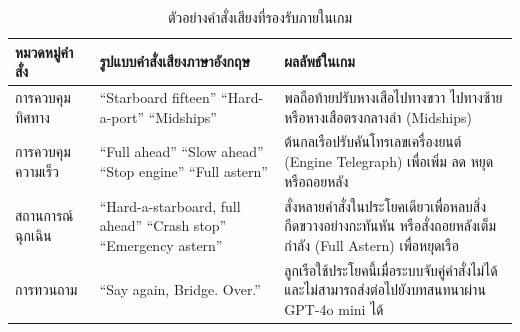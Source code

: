 \begin{table}[H]
\centering
\caption{ตัวอย่างคำสั่งเสียงที่รองรับภายในเกม}
\label{tab:voice_commands}
\small
\begin{tabular}{|L{2.85cm}|L{5.22cm}|L{5.22cm}|}
\hline
\textbf{หมวดหมู่คำสั่ง} & \textbf{รูปแบบคำสั่งเสียงภาษาอังกฤษ} & \textbf{ผลลัพธ์ในเกม} \\ \hline
การควบคุมทิศทาง & ``Starboard fifteen'' ``Hard-a-port'' ``Midships'' & พลถือท้ายปรับหางเสือไปทางขวา ไปทางซ้าย หรือหางเสือตรงกลางลำ (Midships) \\ \hline
การควบคุมความเร็ว & ``Full ahead'' ``Slow ahead'' ``Stop engine'' ``Full astern'' & ต้นกลเรือปรับคันโทรเลขเครื่องยนต์ (Engine Telegraph) เพื่อเพิ่ม ลด หยุด หรือถอยหลัง \\ \hline
สถานการณ์ฉุกเฉิน & ``Hard-a-starboard, full ahead'' ``Crash stop'' ``Emergency astern'' & สั่งหลายคำสั่งในประโยคเดียวเพื่อหลบสิ่งกีดขวางอย่างกะทันหัน หรือสั่งถอยหลังเต็มกำลัง (Full Astern) เพื่อหยุดเรือ \\ \hline
การทวนถาม & ``Say again, Bridge. Over.'' & ลูกเรือใช้ประโยคนี้เมื่อระบบจับคู่คำสั่งไม่ได้และไม่สามารถส่งต่อไปยังบทสนทนาผ่าน GPT-4o mini ได้ \\ \hline
\end{tabular}
\end{table}